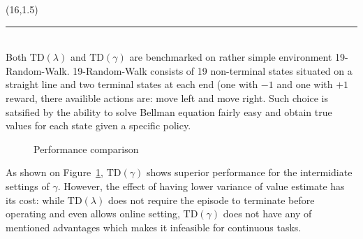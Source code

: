\documentclass[a0]{a0poster}
\def\Head#1{\noindent{\LARGE\color{bluegray} #1}\bigskip}
\begin{document}
\begin{textblock}{7.0}(16,1.5)

\medskip
\hrule\medskip
\Head{Results}\\

Both $\text{TD}(\lambda)$ and $\text{TD}(\gamma)$ are benchmarked on rather
simple environment 19-Random-Walk. 19-Random-Walk consists of 19 non-terminal
states situated on a straight line and two terminal states at each end (one
with $-1$ and one with $+1$ reward, there availible actions are: move left and
move right. Such choice is satsified by the ability to solve Bellman equation
fairly easy and obtain true values for each state given a specific policy.

\begin{center}
\begin{figure}%
    \centering
    \qquad
    \caption{Performance comparison}%
    \label{fig:results}%
\end{figure}
\end{center}

As shown on Figure~\ref{fig:results}, $\text{TD}(\gamma)$ shows superior
performance for the intermidiate settings of $\gamma$. However, the effect of
having lower variance of value estimate has its cost: while
$\text{TD}(\lambda)$ does not require the episode to terminate before operating
and even allows online setting, $\text{TD}(\gamma)$ does not have any of
mentioned advantages which makes it infeasible for continuous tasks.


\end{textblock}
\end{document}

